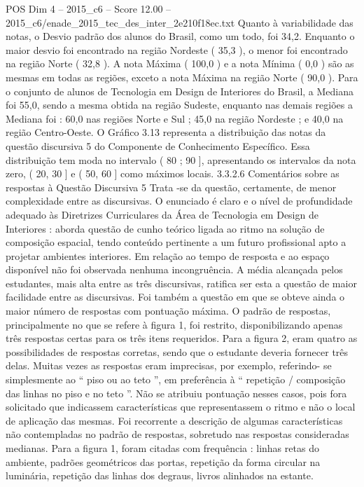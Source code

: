 \begin{textsample}{POS Dim 4 – 2015\_c6 – Score 12.00 – 2015\_c6/enade\_2015\_tec\_des\_inter\_2e210f18ec.txt}
Quanto à variabilidade das notas, o Desvio padrão dos alunos do Brasil, como um todo, foi 34,2.
Enquanto o maior desvio foi encontrado na região Nordeste ( 35,3 ), o menor foi encontrado na região Norte ( 32,8 ).
A nota Máxima ( 100,0 ) e a nota Mínima ( 0,0 ) são as mesmas em todas as regiões, exceto a nota Máxima na região Norte ( 90,0 ).
Para o conjunto de alunos de Tecnologia em Design de Interiores do Brasil, a Mediana foi 55,0, sendo a mesma obtida na região Sudeste, enquanto nas demais regiões a Mediana foi : 60,0 nas regiões Norte e Sul ; 45,0 na região Nordeste ; e 40,0 na região Centro-Oeste.
O Gráfico 3.13 representa a distribuição das notas da questão discursiva 5 do Componente de Conhecimento Específico.
Essa distribuição tem moda no intervalo ( 80 ; 90 ], apresentando os intervalos da nota zero, ( 20, 30 ] e ( 50, 60 ] como máximos locais. 3.3.2.6 Comentários sobre as respostas à Questão Discursiva 5 Trata -se da questão, certamente, de menor complexidade entre as discursivas.
O enunciado é claro e o nível de profundidade adequado às Diretrizes Curriculares da Área de Tecnologia em Design de Interiores : aborda questão de cunho teórico ligada ao ritmo na solução de composição espacial, tendo conteúdo pertinente a um futuro profissional apto a projetar ambientes interiores.
Em relação ao tempo de resposta e ao espaço disponível não foi observada nenhuma incongruência.
A média alcançada pelos estudantes, mais alta entre as três discursivas, ratifica ser esta a questão de maior facilidade entre as discursivas.
Foi também a questão em que se obteve ainda o maior número de respostas com pontuação máxima.
O padrão de respostas, principalmente no que se refere à figura 1, foi restrito, disponibilizando apenas três respostas certas para os três itens requeridos.
Para a figura 2, eram quatro as possibilidades de respostas corretas, sendo que o estudante deveria fornecer três delas.
Muitas vezes as respostas eram imprecisas, por exemplo, referindo- se simplesmente ao “ piso ou ao teto ”, em preferência à “ repetição / composição das linhas no piso e no teto ”.
Não se atribuiu pontuação nesses casos, pois fora solicitado que indicassem características que representassem o ritmo e não o local de aplicação das mesmas.
Foi recorrente a descrição de algumas características não contempladas no padrão de respostas, sobretudo nas respostas consideradas medianas.
Para a figura 1, foram citadas com frequência : linhas retas do ambiente, padrões geométricos das portas, repetição da forma circular na luminária, repetição das linhas dos degraus, livros alinhados na estante.

\end{textsample}

